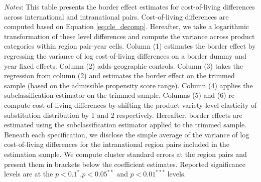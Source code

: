 \begin{table}[H]
        \centering
        \caption{Border effect: Cost-of-living}
        \label{tab: border_effects_cle}
        \begin{spacing}{1.1}
    \end{spacing}
        \parbox{\textwidth}{
        \begin{spacing}{1} 
            {\footnotesize 
            \textit{Notes}: This table presents the border effect estimates for cost-of-living differences across international and intranational pairs. Cost-of-living differences are computed based on Equation \ref{eq:cle_decomp}. Hereafter, we take a logarithmic transformation of these level differences and compute the variance across product categories within region pair-year cells. Column (1) estimates the border effect by regressing the variance of log cost-of-living differences on a border dummy and year fixed effects. Column (2) adds geographic controls. Column (3) takes the regression from column (2) and estimates the border effect on the trimmed sample (based on the admissible propensity score range). Column (4) applies the subclassification estimator on the trimmed sample. Columns (5) and (6) re-compute cost-of-living differences by shifting the product variety level elasticity of substitution distribution by 1 and 2 respectively. Hereafter, border effects are estimated using the subclassification estimator applied to the trimmed sample. Beneath each specification, we disclose the simple average of the variance of log cost-of-living differences for the intranational region pairs included in the estimation sample. We compute cluster standard errors at the region pairs and present them in brackets below the coefficient estimates. Reported significance levels are at the $p<0.1^{*}$,$p<0.05^{**}$ and $p<0.01^{***}$ levels.} 
    \end{spacing}}
 \end{table}


